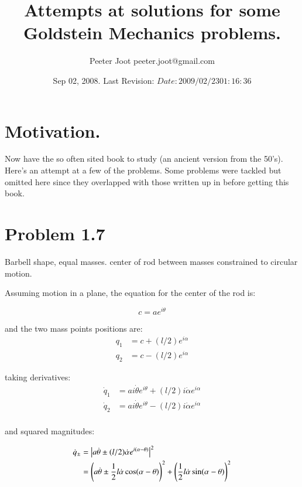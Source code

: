\documentclass{article}
\title{Attempts at solutions for some Goldstein Mechanics problems.}
\author{Peeter Joot \quad peeter.joot@gmail.com }
\date{ Sep 02, 2008.  Last Revision: $Date: 2009/02/23 01:16:36 $ }
\newcommand{\Abs}[1]{\left\lvert{#1}\right\rvert}
\newcommand{\qdot}[0]{\dot{q}}
\newcommand{\dotalpha}[0]{\dot{\alpha}}
\newcommand{\dottheta}[0]{\dot{\theta}}
\begin{document}
             

\maketitle{}

\section{ Motivation. }

Now have the so often sited \cite{goldstein1951cm} book to study (an ancient
version from the 50's).  Here's an attempt at a few of the problems.  Some
problems were tackled but omitted here since they overlapped with those written up in
\cite{PJTongMf1} before getting this book.

\section{ Problem 1.7 }

Barbell shape, equal masses.  center of rod between masses constrained to circular motion.

Assuming motion in a plane, the equation for the center of the rod is:

\begin{equation*}
c = a e^{i\theta}
\end{equation*}

and the two mass points positions are:
\begin{align*}
q_1 &= c + (l/2) e^{i\alpha} \\
q_2 &= c - (l/2) e^{i\alpha}
\end{align*}

taking derivatives:
\begin{align*}
\qdot_1 &= a i \dottheta e^{i\theta} + (l/2) i \dotalpha e^{i\alpha} \\
\qdot_2 &= a i \dottheta e^{i\theta} - (l/2) i \dotalpha e^{i\alpha} \\
\end{align*}

and squared magnitudes:

\begin{align*}
\qdot_{\pm}
&= \Abs{a \dottheta \pm (l/2) \dotalpha e^{i(\alpha - \theta)}}^2 \\
&= \left(a \dottheta   \pm   \inv{2} l \dotalpha \cos(\alpha - \theta)\right)^2 + \left(\inv{2} l \dotalpha \sin(\alpha - \theta)\right)^2
\end{align*}
\end{document}

